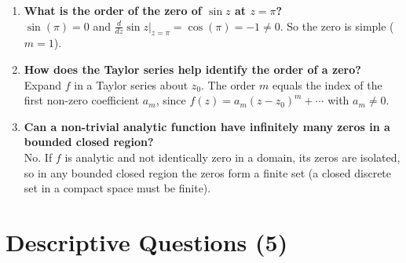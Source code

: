 \documentclass[12pt,a4paper]{article}
\begin{document}
\begin{enumerate}[label=\textbf{Q\arabic*.}]
\item \textbf{What is the order of the zero of $\sin z$ at $z=\pi$?}\\
$\sin(\pi)=0$ and $\frac{d}{dz}\sin z\big|_{z=\pi}=\cos(\pi)=-1\neq 0$. So the zero is simple ($m=1$).

\item \textbf{How does the Taylor series help identify the order of a zero?}\\
Expand $f$ in a Taylor series about $z_0$. The order $m$ equals the index of the first
non-zero coefficient $a_m$, since $f(z)=a_m(z-z_0)^m+\cdots$ with $a_m\neq 0$.

\item \textbf{Can a non-trivial analytic function have infinitely many zeros in a bounded closed
region?}\\
No. If $f$ is analytic and not identically zero in a domain, its zeros are isolated, so in
any bounded closed region the zeros form a finite set (a closed discrete set in a compact
space must be finite).

\end{enumerate}

\section{Descriptive Questions (5)}
\end{document}
